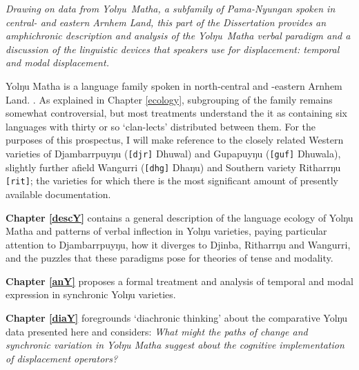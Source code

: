 \documentclass[12pt,dvipsnames]{report}
\newcommand{\mcom}[1]
{\marginpar{\color{black}\raggedleft\raggedright\hspace{0pt}\linespread{0.9}\footnotesize{#1}}}
\begin{document}

%



\iffalse
	
		\noindent\sl Drawing on data from Yolŋu~Matha, a subfamily of Pama-Nyungan spoken in central- and eastern Arnhem Land, this part of the Dissertation provides an amphichronic description and analysis of the Yolŋu~Matha verbal paradigm and a discussion of the linguistic devices that speakers use for displacement: temporal and modal displacement.
		
		Yolŋu Matha is a language family spoken in north-central and -eastern Arnhem Land. \mcom{Xref here to introductory chapter/s}. As explained in Chapter \ref{ecology}, subgrouping of the family remains somewhat controversial, but most treatments understand the it as containing six languages with thirty or so `clan-lects' distributed between them. For the purposes of this prospectus, I will make reference to the closely related Western varieties of Djambarrpuyŋu (\texttt{[djr]} Dhuwal) and Gupapuyŋu (\texttt{[guf]} Dhuwala), slightly further afield Wangurri (\texttt{[dhg]} Dhaŋu) and Southern variety Ritharrŋu \texttt{[rit]}; the varieties for which there is the most significant amount of presently available documentation.
		
		\textbf{Chapter \ref{descY}} contains a general description of the language ecology of Yolŋu Matha and patterns of verbal inflection in Yolŋu varieties, paying particular attention to Djambarrpuyŋu, how it diverges to Djinba, Ritharrŋu and Wangurri, and the puzzles that these paradigms pose for theories of tense and modality.
		
		\textbf{Chapter \ref{anY}} proposes a formal treatment and analysis of temporal and modal expression in synchronic Yolŋu varieties.
		
		\textbf{Chapter \ref{diaY} }foregrounds `diachronic thinking' about the comparative Yolŋu data presented here and considers: {\em What might the paths of change and synchronic variation in Yolŋu Matha suggest about the cognitive implementation of displacement operators?}
		\vfill
		
\end{document}

